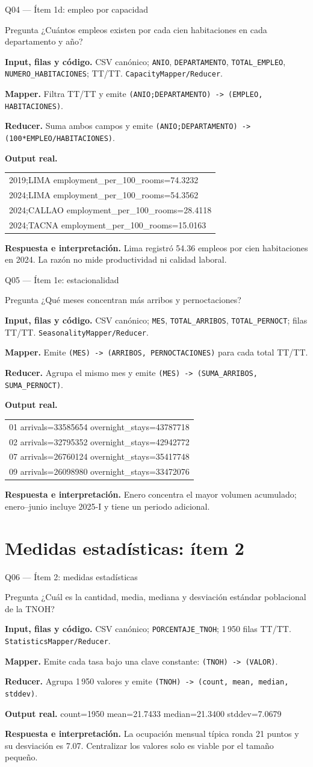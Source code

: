 \documentclass{beamer}
\newcommand{\queryframe}[7]{%
\begin{frame}{#1}
\scriptsize
\begin{alertblock}{Pregunta}
#2
\end{alertblock}
\textbf{Input, filas y código.} #3

\vspace{0.45em}
\textbf{Mapper.} #4

\vspace{0.45em}
\textbf{Reducer.} #5

\vspace{0.45em}
\textbf{Output real.} {\ttfamily\tiny #6}

\vspace{0.45em}
\textbf{Respuesta e interpretación.} #7
\end{frame}
}
\begin{document}
\queryframe{Q04 — Ítem 1d: empleo por capacidad}
{¿Cuántos empleos existen por cada cien habitaciones en cada departamento y año?}
{CSV canónico; \texttt{ANIO}, \texttt{DEPARTAMENTO}, \texttt{TOTAL\_EMPLEO}, \texttt{NUMERO\_HABITACIONES}; TT/TT. \texttt{CapacityMapper/Reducer}.}
{Filtra TT/TT y emite \texttt{(ANIO;DEPARTAMENTO) -> (EMPLEO, HABITACIONES)}.}
{Suma ambos campos y emite \texttt{(ANIO;DEPARTAMENTO) -> (100*EMPLEO/HABITACIONES)}.}
{\begin{tabular}{@{}l@{}}
2019;LIMA employment\_per\_100\_rooms=74.3232 \\
2024;LIMA employment\_per\_100\_rooms=54.3562 \\
2024;CALLAO employment\_per\_100\_rooms=28.4118 \\
2024;TACNA employment\_per\_100\_rooms=15.0163
\end{tabular}}
{Lima registró 54.36 empleos por cien habitaciones en 2024. La razón no mide productividad ni calidad laboral.}

\queryframe{Q05 — Ítem 1e: estacionalidad}
{¿Qué meses concentran más arribos y pernoctaciones?}
{CSV canónico; \texttt{MES}, \texttt{TOTAL\_ARRIBOS}, \texttt{TOTAL\_PERNOCT}; filas TT/TT. \texttt{SeasonalityMapper/Reducer}.}
{Emite \texttt{(MES) -> (ARRIBOS, PERNOCTACIONES)} para cada total TT/TT.}
{Agrupa el mismo mes y emite \texttt{(MES) -> (SUMA\_ARRIBOS, SUMA\_PERNOCT)}.}
{\begin{tabular}{@{}l@{}}
01 arrivals=33585654 overnight\_stays=43787718 \\
02 arrivals=32795352 overnight\_stays=42942772 \\
07 arrivals=26760124 overnight\_stays=35417748 \\
09 arrivals=26098980 overnight\_stays=33472076
\end{tabular}}
{Enero concentra el mayor volumen acumulado; enero--junio incluye 2025-I y tiene un periodo adicional.}

\section{Medidas estadísticas: ítem 2}

\queryframe{Q06 — Ítem 2: medidas estadísticas}
{¿Cuál es la cantidad, media, mediana y desviación estándar poblacional de la TNOH?}
{CSV canónico; \texttt{PORCENTAJE\_TNOH}; 1\,950 filas TT/TT. \texttt{StatisticsMapper/Reducer}.}
{Emite cada tasa bajo una clave constante: \texttt{(TNOH) -> (VALOR)}.}
{Agrupa 1\,950 valores y emite \texttt{(TNOH) -> (count, mean, median, stddev)}.}
{count=1950 mean=21.7433 median=21.3400 stddev=7.0679}
{La ocupación mensual típica ronda 21 puntos y su desviación es 7.07. Centralizar los valores solo es viable por el tamaño pequeño.}
\end{document}
